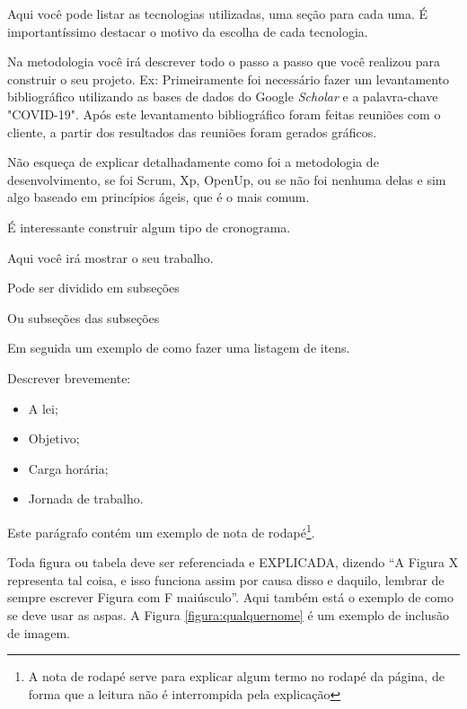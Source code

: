 Aqui você pode listar as tecnologias utilizadas, uma seção para cada uma. É importantíssimo destacar o motivo da escolha de cada tecnologia.


\label{sec:metodologia}

Na metodologia você irá descrever todo o passo a passo que você realizou para construir o seu projeto.
Ex: Primeiramente foi necessário fazer um levantamento bibliográfico utilizando as bases de dados do Google \textit{Scholar} e a palavra-chave "COVID-19". Após este levantamento bibliográfico foram feitas reuniões com o cliente, a partir dos resultados das reuniões foram gerados gráficos.

Não esqueça de explicar detalhadamente como foi a metodologia de desenvolvimento, se foi Scrum, Xp, OpenUp, ou se não foi nenhuma delas e sim algo baseado em princípios ágeis, que é o mais comum.

É interessante construir algum tipo de cronograma.



\label{desenvolvimento}

Aqui você irá mostrar o seu trabalho.

\label{outrasecao}

Pode ser dividido em subseções


Ou subseções das subseções

Em seguida um exemplo de como fazer uma listagem de itens.

\noindent Descrever brevemente:
\begin{itemize}
\item A lei;
\item Objetivo;
\item Carga horária;
\item Jornada de trabalho.

\end{itemize}

Este parágrafo contém um exemplo de nota de rodapé\footnote{A nota de rodapé serve para explicar algum termo no rodapé da página, de forma que a leitura não é interrompida pela explicação}.

Toda figura ou tabela deve ser referenciada e EXPLICADA, dizendo ``A Figura X representa tal coisa, e isso funciona assim por causa disso e daquilo, lembrar de sempre escrever Figura com F maiúsculo''. Aqui também está o exemplo de como se deve usar as aspas. A Figura \ref{figura:qualquernome} é um exemplo de inclusão de imagem.

